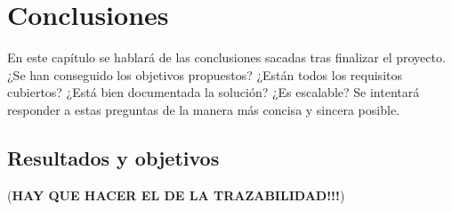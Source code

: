 \chapter{Conclusiones}  \label{conclusiones}

En este capítulo se hablará de las conclusiones sacadas tras finalizar el proyecto. ¿Se han conseguido los objetivos propuestos? ¿Están todos los requisitos cubiertos? ¿Está bien documentada la solución? ¿Es escalable? Se intentará responder a estas preguntas de la manera más concisa y sincera posible. 

\section{Resultados y objetivos} \label{conclusiones.resultados}

(\textbf{HAY QUE HACER EL DE LA TRAZABILIDAD!!!})

